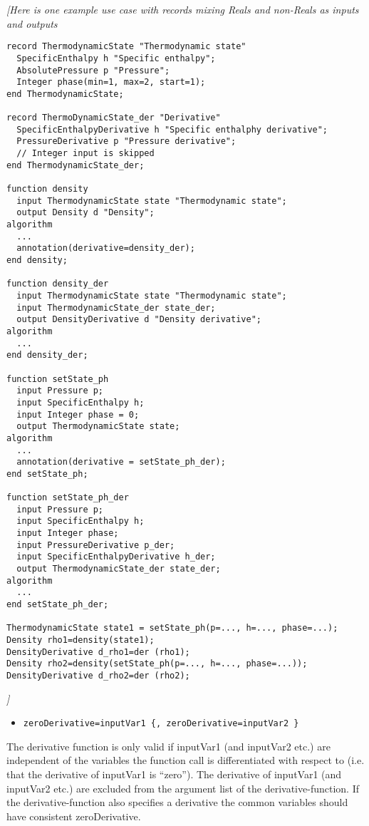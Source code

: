 \emph{{[}Here is one example use case with records mixing Reals and
non-Reals as inputs and outputs}

\begin{lstlisting}[language=modelica]
record ThermodynamicState "Thermodynamic state"
  SpecificEnthalpy h "Specific enthalpy";
  AbsolutePressure p "Pressure";
  Integer phase(min=1, max=2, start=1);
end ThermodynamicState;

record ThermoDynamicState_der "Derivative"
  SpecificEnthalpyDerivative h "Specific enthalphy derivative";
  PressureDerivative p "Pressure derivative";
  // Integer input is skipped
end ThermodynamicState_der;

function density
  input ThermodynamicState state "Thermodynamic state";
  output Density d "Density";
algorithm
  ...
  annotation(derivative=density_der);
end density;

function density_der
  input ThermodynamicState state "Thermodynamic state";
  input ThermodynamicState_der state_der;
  output DensityDerivative d "Density derivative";
algorithm
  ...
end density_der;

function setState_ph
  input Pressure p;
  input SpecificEnthalpy h;
  input Integer phase = 0;
  output ThermodynamicState state;
algorithm
  ...
  annotation(derivative = setState_ph_der);
end setState_ph;

function setState_ph_der
  input Pressure p;
  input SpecificEnthalpy h;
  input Integer phase;
  input PressureDerivative p_der;
  input SpecificEnthalpyDerivative h_der;
  output ThermodynamicState_der state_der;
algorithm
  ...
end setState_ph_der;

ThermodynamicState state1 = setState_ph(p=..., h=..., phase=...);
Density rho1=density(state1);
DensityDerivative d_rho1=der (rho1);
Density rho2=density(setState_ph(p=..., h=..., phase=...));
DensityDerivative d_rho2=der (rho2);
\end{lstlisting}
\emph{{]}}

\begin{itemize}
\item
  \lstinline!zeroDerivative=inputVar1 {, zeroDerivative=inputVar2 }!
\end{itemize}

The derivative function is only valid if inputVar1 (and inputVar2 etc.)
are independent of the variables the function call is differentiated
with respect to (i.e. that the derivative of inputVar1 is ``zero''). The
derivative of inputVar1 (and inputVar2 etc.) are excluded from the
argument list of the derivative-function. If the derivative-function
also specifies a derivative the common variables should have consistent
zeroDerivative.

